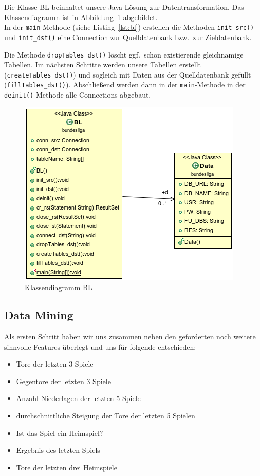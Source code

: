 \documentclass[
10pt,
a4paper
]{scrartcl}
\begin{document}
Die Klasse BL beinhaltet unsere Java L\"{o}sung zur Datentransformation. Das Klassendiagramm ist in Abbildung~\ref{fig4} abgebildet.\\

In der \texttt{main}-Methode (siehe Listing~\ref{lst:bl}) erstellen die Methoden \texttt{init\_src()} und \texttt{init\_dst()} eine Connection zur Quelldatenbank bzw.~zur Zieldatenbank.



Die Methode \texttt{dropTables\_dst()} l\"{o}scht ggf.~schon existierende gleichnamige Tabellen. Im n\"{a}chsten Schritte werden unsere Tabellen erstellt (\texttt{createTables\_dst()}) und sogleich mit Daten aus der Quelldatenbank gef\"{u}llt (\texttt{fillTables\_dst()}). Abschlie{\ss}end werden dann in der \texttt{main}-Methode in der \texttt{deinit()} Methode alle Connections abgebaut.

\begin{figure}[hb]
\centering
\includegraphics[scale=0.7]{BL.png}
\caption{Klassendiagramm BL}
\label{fig4}
\end{figure}

\subsection{Data Mining}
Als ersten Schritt haben wir uns zusammen neben den geforderten noch weitere sinnvolle Features überlegt
und uns für folgende entschieden:

 \begin{itemize}
  \item Tore der letzten 3 Spiele
  \item Gegentore der letzten 3 Spiele
  \item Anzahl Niederlagen der letzten 5 Spiele
  \item durchschnittliche Steigung der Tore der letzten 5 Spielen
  \item Ist das Spiel ein Heimspiel?
  \item Ergebnis des letzten Spiels
  \item Tore der letzten drei Heimspiele
 \end{itemize}
\end{document}
